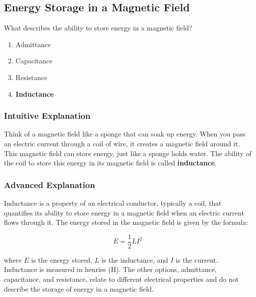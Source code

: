 \subsection{Energy Storage in a Magnetic Field}
\label{T5C03}

\begin{tcolorbox}[colback=gray!10!white,colframe=black!75!black,title=T5C03]
What describes the ability to store energy in a magnetic field?
\begin{enumerate}[noitemsep]
    \item Admittance
    \item Capacitance
    \item Resistance
    \item \textbf{Inductance}
\end{enumerate}
\end{tcolorbox}

\subsubsection*{Intuitive Explanation}
Think of a magnetic field like a sponge that can soak up energy. When you pass an electric current through a coil of wire, it creates a magnetic field around it. This magnetic field can store energy, just like a sponge holds water. The ability of the coil to store this energy in its magnetic field is called \textbf{inductance}.

\subsubsection*{Advanced Explanation}
Inductance is a property of an electrical conductor, typically a coil, that quantifies its ability to store energy in a magnetic field when an electric current flows through it. The energy stored in the magnetic field is given by the formula:

\[
E = \frac{1}{2} L I^2
\]

where \( E \) is the energy stored, \( L \) is the inductance, and \( I \) is the current. Inductance is measured in henries (H). The other options, admittance, capacitance, and resistance, relate to different electrical properties and do not describe the storage of energy in a magnetic field.